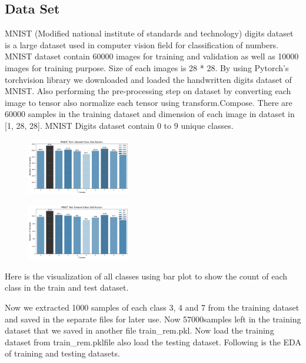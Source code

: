 \documentclass[conference]{IEEEtran}
\begin{document}
\subsection{Data Set}
MNIST (Modified national institute of standards and technology) digits dataset is a large dataset used in computer vision field for classification of numbers. MNIST dataset contain 60000 images for training and validation as well as 10000 images for training purpose. Size of each images is 28 * 28. 
By using Pytorch’s torchvision library we downloaded and loaded the handwritten digits dataset of MNIST. Also performing the pre-processing step on dataset by converting each image to tensor also normalize each tensor using transform.Compose. There are 60000 samples in the training dataset and dimension of each image in dataset in [1, 28, 28]. MNIST Digits dataset contain 0 to 9 unique classes. 
\begin{figure}[h]
    \centering
    \includegraphics[width=0.4\textwidth, keepaspectratio]{mnist_train.png}
\end{figure}

\begin{figure}[h]
    \centering
    \includegraphics[width=0.4\textwidth, keepaspectratio]{mnist_test.png}
\end{figure}

Here is the visualization of all classes using bar plot to show the count of each class in the train and test dataset.

\vspace{0.5cm}
Now we extracted 1000 samples of each class 3, 4 and 7 from the training dataset and saved in the separate files for later use. Now 57000samples left in the training dataset that we saved in another file train\_rem.pkl. Now load the training dataset from train\_rem.pklfile also load the testing dataset. Following is the EDA of training and testing datasets.
\end{document}
